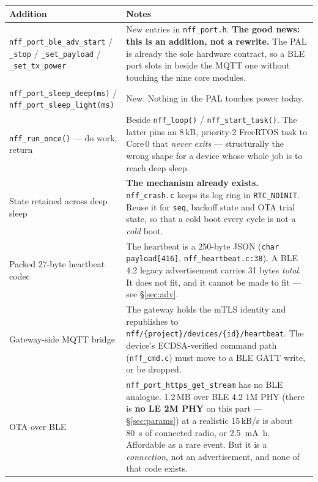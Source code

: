 \documentclass[11pt,a4paper]{article}
\begin{document}
\begin{center}
\begin{tabularx}{\textwidth}{lX}
\toprule
\textbf{Addition} & \textbf{Notes} \\
\midrule
\texttt{nff\_port\_ble\_adv\_start} / \texttt{\_stop} / \texttt{\_set\_payload} / \texttt{\_set\_tx\_power}
  & New entries in \texttt{nff\_port.h}. \textbf{The good news: this is an addition, not a
    rewrite.} The PAL is already the sole hardware contract, so a BLE port slots in beside the
    MQTT one without touching the nine core modules. \\
\texttt{nff\_port\_sleep\_deep(ms)} / \texttt{nff\_port\_sleep\_light(ms)}
  & New. Nothing in the PAL touches power today. \\
\texttt{nff\_run\_once()} --- do work, return
  & Beside \texttt{nff\_loop()} / \texttt{nff\_start\_task()}. The latter pins an 8\,kB,
    priority-2 FreeRTOS task to Core\,0 that \emph{never exits} --- structurally the wrong shape
    for a device whose whole job is to reach deep sleep. \\
State retained across deep sleep
  & \textbf{The mechanism already exists.} \texttt{nff\_crash.c} keeps its log ring in
    \texttt{RTC\_NOINIT}. Reuse it for \texttt{seq}, backoff state and OTA trial state, so that a
    cold boot every cycle is not a \emph{cold} boot. \\
Packed 27-byte heartbeat codec
  & The heartbeat is a 250-byte JSON (\texttt{char payload[416]},
    \texttt{nff\_heartbeat.c:38}). A BLE 4.2 legacy advertisement carries 31 bytes \emph{total}.
    It does not fit, and it cannot be made to fit --- see \S\ref{sec:adv}. \\
Gateway-side MQTT bridge
  & The gateway holds the mTLS identity and republishes to
    \texttt{nff/\{project\}/devices/\{id\}/heartbeat}. The device's ECDSA-verified command path
    (\texttt{nff\_cmd.c}) must move to a BLE GATT write, or be dropped. \\
OTA over BLE
  & \texttt{nff\_port\_https\_get\_stream} has no BLE analogue. 1.2\,MB over BLE 4.2 1M PHY (there
    is \textbf{no LE 2M PHY} on this part --- \S\ref{sec:params}) at a realistic 15\,kB/s is about
    \SI{80}{\second} of connected radio, or \SI{2.5}{\milli\ampere\hour}. Affordable as a rare
    event. But it is a \emph{connection}, not an advertisement, and none of that code exists. \\
\bottomrule
\end{tabularx}
\end{center}
\end{document}
